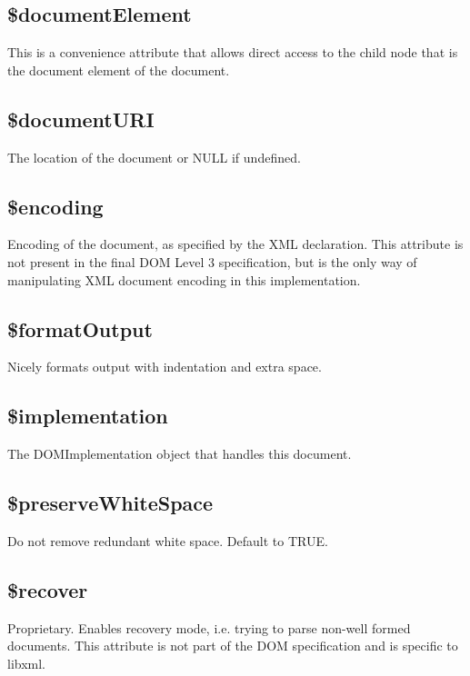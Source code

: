 \subsection{\$documentElement}

This is a convenience attribute that allows direct access to the child node that is the document element of the document.

\subsection{\$documentURI}

The location of the document or NULL if undefined.

\subsection{\$encoding}

Encoding of the document, as specified by the XML declaration. This attribute is not present in the final DOM Level 3 specification, but is the only way of manipulating XML document encoding in this implementation.

\subsection{\$formatOutput}

Nicely formats output with indentation and extra space.

\subsection{\$implementation}

The DOMImplementation object that handles this document.

\subsection{\$preserveWhiteSpace}

Do not remove redundant white space. Default to TRUE.

\subsection{\$recover}

Proprietary. Enables recovery mode, i.e. trying to parse non-well formed documents. This attribute is not part of the DOM specification and is specific to libxml.

